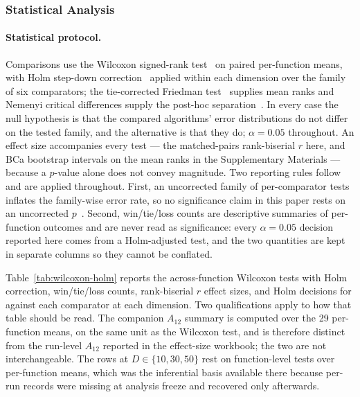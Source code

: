 \subsubsection{Statistical Analysis}\label{sec:exp:stats}

\paragraph{Statistical protocol.}
Comparisons use the Wilcoxon signed-rank test~\cite{wilcoxon1945individual} on
paired per-function means, with Holm step-down
correction~\cite{holm1979simple} applied within each dimension over the family
of six comparators; the tie-corrected Friedman test~\cite{friedman1937use}
supplies mean ranks and Nemenyi critical differences supply the post-hoc
separation~\cite{demsar2006statistical}. In every case the null hypothesis is
that the compared algorithms' error distributions do not differ on the tested
family, and the alternative is that they do; $\alpha = 0.05$ throughout.
An effect size accompanies every test
--- the matched-pairs rank-biserial $r$ here, and BCa bootstrap intervals on the
mean ranks in the Supplementary Materials --- because a $p$-value alone does not
convey magnitude. Two reporting rules follow and are applied throughout. First,
an uncorrected family of per-comparator tests inflates the family-wise error
rate, so no significance claim in this paper rests on an uncorrected
$p$~\cite{holm1979simple,demsar2006statistical}. Second, win/tie/loss counts are
descriptive summaries of per-function outcomes and are never read as
significance: every $\alpha = 0.05$ decision reported here comes from a
Holm-adjusted test, and the two quantities are kept in separate columns so they
cannot be conflated.

Table~\ref{tab:wilcoxon-holm} reports the across-function Wilcoxon
tests with Holm correction, win/tie/loss counts, rank-biserial $r$ effect
sizes, and Holm decisions for \dtgsk{} against each comparator at
each dimension. Two qualifications apply to how that table should be
read. The companion $A_{12}$ summary is computed over the 29 per-function means,
on the same unit as the Wilcoxon test, and is therefore distinct from
the run-level $A_{12}$ reported in the effect-size workbook; the two
are not interchangeable. The \apgsk{} rows at
$D \in \{10, 30, 50\}$ rest on function-level tests over per-function
means, which was the inferential basis available there because \apgsk{}
per-run records were missing at analysis freeze and recovered only
afterwards.

